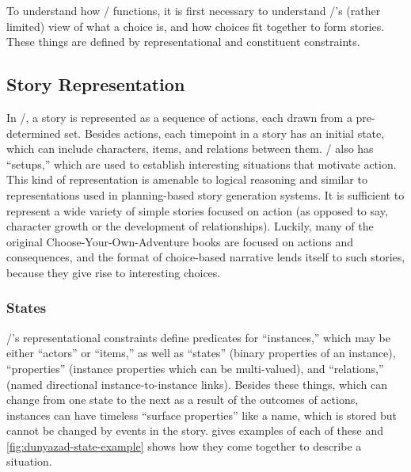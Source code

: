 To understand how \dunyazad/ functions, it is first necessary to understand \dunyazad/'s (rather limited) view of what a choice is, and how choices fit together to form stories.
%
These things are defined by representational and constituent constraints.


\subsection{Story Representation}


In \dunyazad/, a story is represented as a sequence of actions, each drawn from a pre-determined set.
%
Besides actions, each timepoint in a story has an initial state, which can include characters, items, and relations between them.
%
\dunyazad/ also has ``setups,'' which are used to establish interesting situations that motivate action.
%
This kind of representation is amenable to logical reasoning and similar to representations used in planning-based story generation systems.
%
It is sufficient to represent a wide variety of simple stories focused on action (as opposed to say, character growth or the development of relationships).
%
Luckily, many of the original Choose-Your-Own-Adventure books are focused on actions and consequences, and the format of choice-based narrative lends itself to such stories, because they give rise to interesting choices.


\subsubsection{States}

\dunyazad/'s representational constraints define predicates for ``instances,'' which may be either ``actors'' or ``items,'' as well as ``states'' (binary properties of an instance), ``properties'' (instance properties which can be multi-valued), and ``relations,'' (named directional instance-to-instance links).
%
Besides these things, which can change from one state to the next as a result of the outcomes of actions, instances can have timeless ``surface properties'' like a name, which is stored but cannot be changed by events in the story.
%
 gives examples of each of these and \cref{fig:dunyazad-state-example} shows how they come together to describe a situation.


